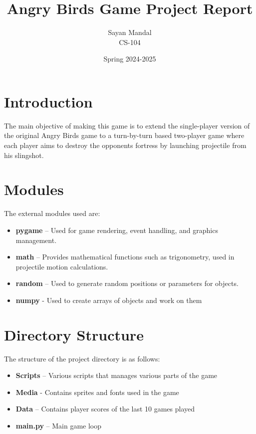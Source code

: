 \documentclass[12pt]{article}
\title{\textbf{Angry Birds Game Project Report}}
\author{Sayan Mandal \\ \small CS-104}
\date{Spring 2024-2025}
\begin{document}
\maketitle
\tableofcontents
\newpage

\section{Introduction}
The main objective of making this game is to extend the single-player version of the original Angry Birds game to a turn-by-turn based two-player game where each player aims to destroy the opponents fortress by launching projectile from his slingshot.

\section{Modules}
The external modules used are:
\begin{itemize}
    \item \textbf{pygame} – Used for game rendering, event handling, and graphics management.
    \item \textbf{math} – Provides mathematical functions such as trigonometry, used in projectile motion calculations.
    \item \textbf{random} – Used to generate random positions or parameters for objects.
    \item \textbf{numpy} - Used to create arrays of objects and work on them
\end{itemize}

\section{Directory Structure}
The structure of the project directory is as follows:
\begin{itemize}
    \item \textbf{Scripts} – Various scripts that manages various parts of the game
    \item \textbf{Media} - Contains sprites and fonts used in the game
    \item \textbf{Data} – Contains player scores of the last 10 games played
    \item \textbf{main.py} – Main game loop
\end{itemize}
\end{document}
